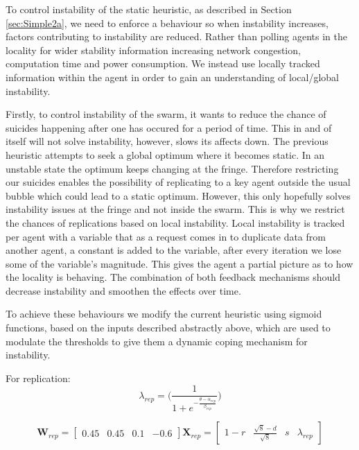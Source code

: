 \documentclass{UoYCSproject}
\begin{document}
To control instability of the static heuristic, as described in Section \ref{sec:Simple2a}, we need to enforce a behaviour so when instability increases, factors contributing to instability are reduced.
Rather than polling agents in the locality for wider stability information increasing network congestion, computation time and power consumption.
We instead use locally tracked information within the agent in order to gain an understanding of local/global instability.

Firstly, to control instability of the swarm, it wants to reduce the chance of suicides happening after one has occured for a period of time.
This in and of itself will not solve instability, however, slows its affects down.
The previous heuristic attempts to seek a global optimum where it becomes static.
In an unstable state the optimum keeps changing at the fringe.
Therefore restricting our suicides enables the possibility of replicating to a key agent outside the usual bubble which could lead to a static optimum.
However, this only hopefully solves instability issues at the fringe and not inside the swarm.
This is why we restrict the chances of replications based on local instability.
Local instability is tracked per agent with a variable that as a request comes in to duplicate data from another agent, a constant is added to the variable, after every iteration we lose some of the variable's magnitude.
This gives the agent a partial picture as to how the locality is behaving.
The combination of both feedback mechanisms should decrease instability and smoothen the effects over time.

To achieve these behaviours we modify the current heuristic using sigmoid functions, based on the inputs described abstractly above, which are used to modulate the thresholds to give them a dynamic coping mechanism for instability.

For replication:
\begin{equation}
\label{eq:1}
\lambda_{rep} = \big( \frac{1}{1+ e^{- \frac{ \theta - \alpha_{rep} }{ \beta_{rep} } } } \big)
\end{equation}

\begin{equation}
\label{eq:100}
\textbf{W}_{rep} = \begin{bmatrix}0.45 & 0.45 & 0.1 & -0.6 \end{bmatrix}
\textbf{X}_{rep} = \begin{bmatrix} 1-r & \frac{\sqrt{8}-d}{\sqrt{8}} & s & \lambda_{rep} \end{bmatrix}
\end{equation}
\end{document}
